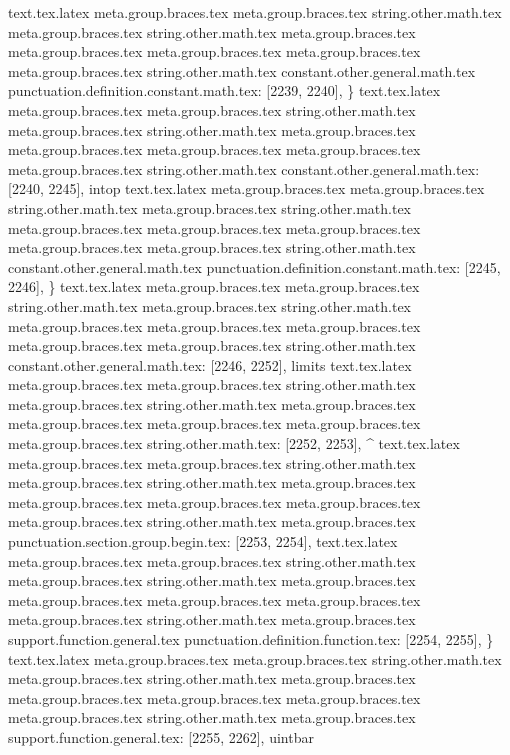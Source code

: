 {{{{{{{{{{{{{{{{{{{{{{{{{{{{{{{{{{{{{{{{{{{{{{{{{{{{{{{{{{{{{{{{{{{{{{{text.tex.latex meta.group.braces.tex meta.group.braces.tex string.other.math.tex meta.group.braces.tex string.other.math.tex meta.group.braces.tex meta.group.braces.tex meta.group.braces.tex meta.group.braces.tex meta.group.braces.tex string.other.math.tex constant.other.general.math.tex punctuation.definition.constant.math.tex: [2239, 2240], {\}
text.tex.latex meta.group.braces.tex meta.group.braces.tex string.other.math.tex meta.group.braces.tex string.other.math.tex meta.group.braces.tex meta.group.braces.tex meta.group.braces.tex meta.group.braces.tex meta.group.braces.tex string.other.math.tex constant.other.general.math.tex: [2240, 2245], {intop}
text.tex.latex meta.group.braces.tex meta.group.braces.tex string.other.math.tex meta.group.braces.tex string.other.math.tex meta.group.braces.tex meta.group.braces.tex meta.group.braces.tex meta.group.braces.tex meta.group.braces.tex string.other.math.tex constant.other.general.math.tex punctuation.definition.constant.math.tex: [2245, 2246], {\}
text.tex.latex meta.group.braces.tex meta.group.braces.tex string.other.math.tex meta.group.braces.tex string.other.math.tex meta.group.braces.tex meta.group.braces.tex meta.group.braces.tex meta.group.braces.tex meta.group.braces.tex string.other.math.tex constant.other.general.math.tex: [2246, 2252], {limits}
text.tex.latex meta.group.braces.tex meta.group.braces.tex string.other.math.tex meta.group.braces.tex string.other.math.tex meta.group.braces.tex meta.group.braces.tex meta.group.braces.tex meta.group.braces.tex meta.group.braces.tex string.other.math.tex: [2252, 2253], {^}
text.tex.latex meta.group.braces.tex meta.group.braces.tex string.other.math.tex meta.group.braces.tex string.other.math.tex meta.group.braces.tex meta.group.braces.tex meta.group.braces.tex meta.group.braces.tex meta.group.braces.tex string.other.math.tex meta.group.braces.tex punctuation.section.group.begin.tex: [2253, 2254], {{}
text.tex.latex meta.group.braces.tex meta.group.braces.tex string.other.math.tex meta.group.braces.tex string.other.math.tex meta.group.braces.tex meta.group.braces.tex meta.group.braces.tex meta.group.braces.tex meta.group.braces.tex string.other.math.tex meta.group.braces.tex support.function.general.tex punctuation.definition.function.tex: [2254, 2255], {\}
text.tex.latex meta.group.braces.tex meta.group.braces.tex string.other.math.tex meta.group.braces.tex string.other.math.tex meta.group.braces.tex meta.group.braces.tex meta.group.braces.tex meta.group.braces.tex meta.group.braces.tex string.other.math.tex meta.group.braces.tex support.function.general.tex: [2255, 2262], {uintbar}
}}}}}}}}}}}}}}}}}}}}}}}}}}}}}}}}}}}}}}}}}}}}}}}}}}}}}}}}}}}}}}}}}}}}}}}}}}}
